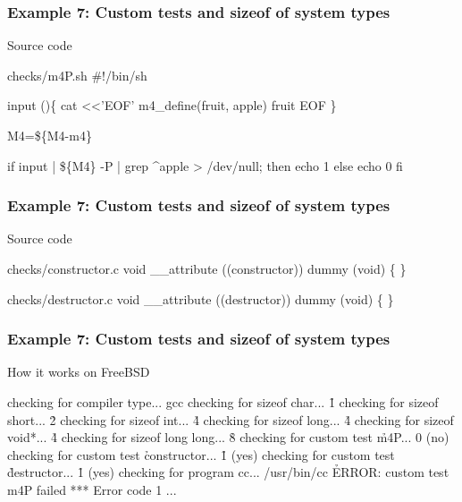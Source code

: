 \documentclass[hyperref={colorlinks=true}]{beamer}
\begin{document}
\begin{frame}[fragile]
  \frametitle{Example 7: Custom tests and sizeof of system types}

\begin{block}{Source code}
\begin{Code}{checks/m4P.sh}
#!/bin/sh

input ()\{
    cat <<'EOF'
m4\_define(fruit, apple)
fruit
EOF
\}

M4=\$\{M4-m4\}

if input | \$\{M4\} -P | grep \^{}apple > /dev/null; then
    echo 1
else
    echo 0
fi
\end{Code}
\end{block}
\end{frame}

\begin{frame}[fragile]
  \frametitle{Example 7: Custom tests and sizeof of system types}
\begin{block}{Source code}
\begin{Code}{checks/constructor.c}
void __attribute ((constructor))
        dummy (void)
\{
\}
\end{Code}
\begin{Code}{checks/destructor.c}
void __attribute ((destructor))
        dummy (void)
\{
\}
\end{Code}
\end{block}
\end{frame}

\begin{frame}[fragile]
  \frametitle{Example 7: Custom tests and sizeof of system types}

  \begin{block}{How it works on FreeBSD}
  \begin{CodeNoLabel}
checking for compiler type... gcc
checking for sizeof char... \h{1}
checking for sizeof short... \h{2}
checking for sizeof int... \h{4}
checking for sizeof long... \h{4}
checking for sizeof void*... \h{4}
checking for sizeof long long... \h{8}
checking for custom test \h{m4P... 0 (no)}
checking for custom test \h{constructor}... \h{1 (yes)}
checking for custom test \h{destructor}... \h{1 (yes)}
checking for program cc... /usr/bin/cc
\h{ERROR: custom test m4P failed}
*** Error code 1
...
\prompt{\$}
  \end{CodeNoLabel}
  \end{block}
\end{frame}
\end{document}
